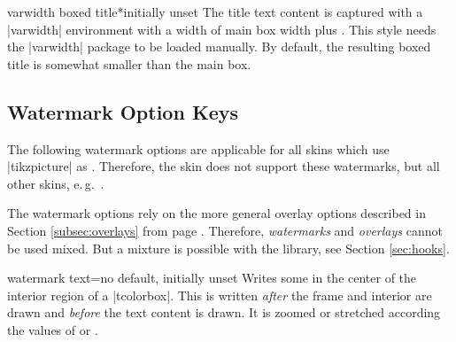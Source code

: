 \begin{docTcbKey}{varwidth boxed title*}{}{initially unset}
The title text content is captured with a |varwidth| environment with a width of main box width plus .
This style needs the |varwidth| package \cite{arseneau:2011a} to be loaded manually.
By default, the resulting boxed title is somewhat smaller than the main box.
\end{docTcbKey}


\clearpage
\subsection{Watermark Option Keys}\label{subsec:watermarks}
The following watermark options are applicable for all skins which
use |tikzpicture| as .
Therefore, the skin  does not support these watermarks,
but all other skins, e.\,g.\ .

\begin{marker}
The watermark options rely on the more general overlay options described in
Section \ref{subsec:overlays} from page \pageref{subsec:overlays}.
Therefore, \emph{watermarks} and \emph{overlays} cannot be used mixed.
But a mixture is possible with the  library, see Section \ref{sec:hooks}.
\end{marker}


\begin{docTcbKey}{watermark text}{=}{no default, initially unset}
  Writes some  in the center of the interior region of a |tcolorbox|.
  This  is written \emph{after} the
  frame and interior are drawn and \emph{before} the text content is drawn.
  It is zoomed or stretched according the values of
   or .
\begin{dispExample}

\begin{tcolorbox}[enhanced,title=My title,watermark text=My Watermark]
\lipsum[1]
\tcblower
\lipsum[2]
\end{tcolorbox}
\end{dispExample}
\end{docTcbKey}

